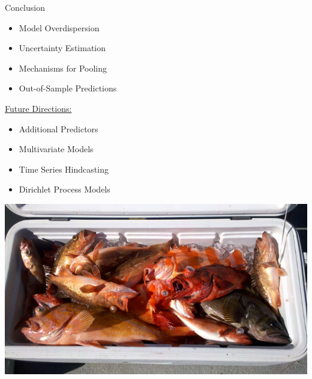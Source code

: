 \documentclass[ xcolor = pdftex, dvipsnames, table ]{beamer}
\begin{document}
\begin{frame}{Conclusion}
{\begin{minipage}[h!]{0.6\textwidth}
\begin{itemize}
\item Model Overdispersion
\item Uncertainty Estimation
\item Mechanisms for Pooling
\item Out-of-Sample Predictions
\end{itemize}
\underline{Future Directions:}
\begin{itemize}
\item Additional Predictors
\item Multivariate Models
\item Time Series Hindcasting
\item Dirichlet Process Models
\end{itemize}
\end{minipage}
\begin{minipage}[h!]{0.29\textwidth}
\includegraphics[width=2\textwidth, angle=-90]{../pictures/fishChest.png}
\end{minipage}
}
\end{frame}

%
%
\end{document}
